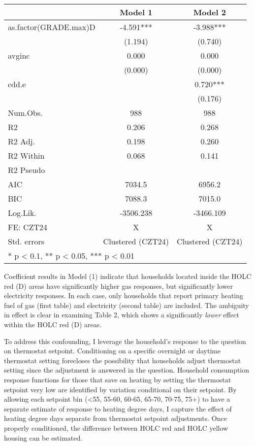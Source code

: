 \documentclass[
]{article}
\begin{document}
\begin{table}[H]
\centering
\begin{tabular}[t]{lcc}
\toprule
  & Model 1 & Model 2\\
\midrule
as.factor(GRADE.max)D & -4.591*** & -3.988***\\
 & (1.194) & (0.740)\\
avginc & 0.000 & 0.000\\
 & (0.000) & (0.000)\\
cdd.e &  & 0.720***\\
 &  & (0.176)\\
\midrule
Num.Obs. & 988 & 988\\
R2 & 0.206 & 0.268\\
R2 Adj. & 0.198 & 0.260\\
R2 Within & 0.068 & 0.141\\
R2 Pseudo &  & \\
AIC & 7034.5 & 6956.2\\
BIC & 7088.3 & 7015.0\\
Log.Lik. & -3506.238 & -3466.109\\
FE: CZT24 & X & X\\
Std. errors & Clustered (CZT24) & Clustered (CZT24)\\
\bottomrule
\multicolumn{3}{l}{\textsuperscript{} * p < 0.1, ** p < 0.05, *** p < 0.01}\\
\end{tabular}
\end{table}

Coefficient results in Model (1) indicate that households located inside
the HOLC red (D) areas have significantly higher gas responses, but
significantly lower electricity responses. In each case, only households
that report primary heating fuel of gas (first table) and electricity
(second table) are included. The ambiguity in effect is clear in
examining Table 2, which shows a significantly \emph{lower} effect
within the HOLC red (D) areas.

To address this confounding, I leverage the household's response to the
question on thermostat setpoint. Conditioning on a specific overnight or
daytime thermostat setting forecloses the possibility that households
adjust thermostat setting since the adjustment is answered in the
question. Household consumption response functions for those that save
on heating by setting the thermostat setpoint very low are identified by
variation conditional on their setpoint. By allowing each setpoint bin
(\textless55, 55-60, 60-65, 65-70, 70-75, 75+) to have a separate
estimate of response to heating degree days, I capture the effect of
heating degree days separate from thermostat setpoint adjustments. Once
properly conditioned, the difference between HOLC red and HOLC yellow
housing can be estimated.
\end{document}
